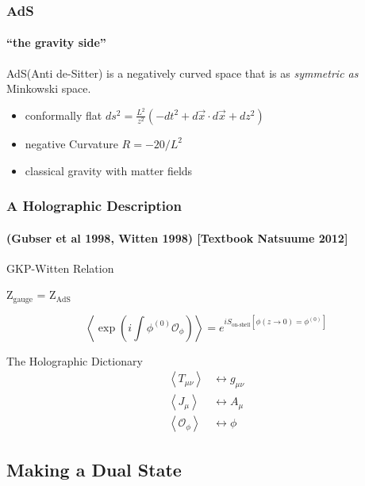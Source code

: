 \documentclass{beamer}
\begin{document}
\begin{frame}
  \frametitle{AdS}
  \framesubtitle{``the gravity side''}

  \begin{block}{}
    \alert{AdS}(Anti de-Sitter) is a negatively curved space that is as \textit{symmetric as} Minkowski space.
  \end{block}

  \begin{itemize}
    \item conformally flat 
      $ds^2 = \frac {L^2}{z^2} \left( -dt^2 + d\vec x\cdot d\vec x + dz^2 \right)$
    \item negative Curvature 
      $R = -20/L^2$
    \item classical gravity with matter fields
  \end{itemize}

\end{frame}


\begin{frame}
  \frametitle{A Holographic Description }
  \framesubtitle{(Gubser et al 1998, Witten 1998) [Textbook Natsuume 2012]}
  \begin{block}{GKP-Witten Relation}
    \begin{center}Z$_\text{gauge}$ = Z$_\text{AdS}$\end{center}
    $$\left\langle \exp\left(i\int\phi^{(0)} \mathcal O_\phi\right) \right\rangle =  e^{i S_\text{on-shell}[\phi(z\rightarrow0) = \phi^{(0)}]}$$
  \end{block}
  
  \begin{block}{The Holographic Dictionary}
    \begin{align*}
      \left\langle T_{\mu\nu}\right\rangle &\longleftrightarrow g_{\mu\nu}\\
      \left\langle J_{\mu}\right\rangle &\longleftrightarrow A_{\mu}\\
      \left\langle\mathcal O_\phi\right\rangle &\longleftrightarrow \phi
    \end{align*}
  \end{block}


\end{frame}

\subsection{Making a Dual State}
\end{document}
